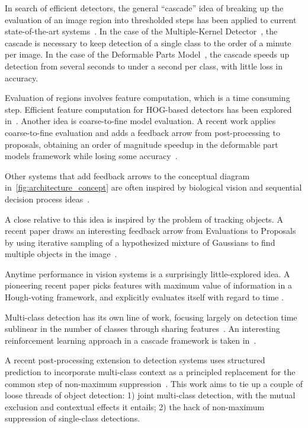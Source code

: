 In search of efficient detectors, the general ``cascade'' idea of breaking up the evaluation of an image region into thresholded steps has been applied to current state-of-the-art systems~\cite{Vedaldi2009, Felzenszwalb2010a}.
In the case of the Multiple-Kernel Detector~\cite{Vedaldi2009}, the cascade is necessary to keep detection of a single class to the order of a minute per image.
In the case of the Deformable Parts Model~\cite{Felzenszwalb2010a}, the cascade speeds up detection from several seconds to under a second per class, with little loss in accuracy.

Evaluation of regions involves feature computation, which is a time consuming step.
Efficient feature computation for HOG-based detectors has been explored in~\cite{Dollar2010}.
Another idea is coarse-to-fine model evaluation.
A recent work applies coarse-to-fine evaluation and adds a feedback arrow from post-processing to proposals, obtaining an order of magnitude speedup in the deformable part models framework while losing some accuracy~\cite{Pedersoli2011}.

Other systems that add feedback arrows to the conceptual diagram in~\autoref{fig:architecture_concept} are often inspired by biological vision and sequential decision process ideas~\cite{Butko2009,Vogel2008,Paletta2005}.

A close relative to this idea is inspired by the problem of tracking objects.
A recent paper draws an interesting feedback arrow from Evaluations to Proposals by using iterative sampling of a hypothesized mixture of Gaussians to find multiple objects in the image~\cite{Gualdi2010}.

Anytime performance in vision systems is a surprisingly little-explored idea.
A pioneering recent paper picks features with maximum value of information in a Hough-voting framework, and explicitly evaluates itself with regard to time \cite{Vijayanarasimhan2010}.

Multi-class detection has its own line of work, focusing largely on detection time sublinear in the number of classes through sharing features~\cite{Torralba2007,Fan2005,Razavi2011}.
An interesting reinforcement learning approach in a cascade framework is taken in~\cite{Isukapalli2006}.

A recent post-processing extension to detection systems uses structured prediction to incorporate multi-class context as a principled replacement for the common step of non-maximum suppression~\cite{Desai2009}.
This work aims to tie up a couple of loose threads of object detection: 1) joint multi-class detection, with the mutual exclusion and contextual effects it entails; 2) the hack of non-maximum suppression of single-class detections.

